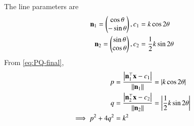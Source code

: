 The line parameters are
\begin{align}
    \mathbf{n}_1 = \begin{pmatrix}\cos\theta \\ -\sin\theta\end{pmatrix},  {c}_1 &= {k}\cos2\theta\\
    \mathbf{n}_2 = \begin{pmatrix}\sin\theta \\ \cos\theta\end{pmatrix},  {c}_2 &= \frac{1}{2}{k}\sin2\theta
\end{align}
			From \eqref{eq:PQ-final},
\begin{align}
    {p} &= \frac{\left\vert  \mathbf{n}_1^{\top}\mathbf{x}-{c}_1 \right\vert}{\left\lVert\mathbf{n}_1\right\rVert} 
    = \left\vert{k}\cos2\theta\right\vert \\
     {q} &= \frac{\left\vert  \mathbf{n}_2^{\top}\mathbf{x}-{c}_2 \right\vert}{\left\lVert\mathbf{n}_2\right\rVert} 
    = \left\vert \frac{1}{2}{k}\sin2\theta\right\vert
    \\
	\implies
	{p}^2 + 4{q}^2 & 
= {k}^2
\end{align}
